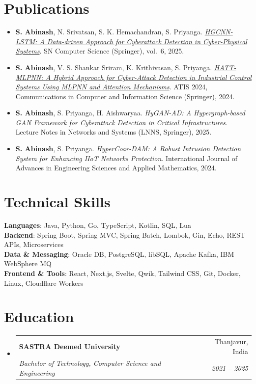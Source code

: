 \documentclass[letterpaper,11pt]{article}
\makeatletter
\newcommand{\resumeSubheading}[4]{
  \vspace{-1pt}\item
    \begin{tabular*}{\linewidth}[t]{l@{\extracolsep{\fill}}r}
      \textbf{#1} & \small #2 \\
      \small\textit{#3} & \small\textit{#4} \\
    \end{tabular*}\vspace{-6pt}
}
\newcommand{\resumeListStart}{\begin{itemize}[leftmargin=0.15in, label={}]}
\newcommand{\resumeListEnd}{\end{itemize}}
\makeatother
\begin{document}
\section{Publications}
\begin{itemize}[leftmargin=0.33in, itemsep=1pt, topsep=2pt]
  \small
  \item \textbf{S. Abinash}, N. Srivatsan, S. K. Hemachandran, S. Priyanga.
    \href{https://doi.org/10.1007/s42979-024-03613-7}{\textit{HGCNN-LSTM: A Data-driven Approach for Cyberattack
    Detection in Cyber-Physical Systems}}. SN Computer Science (Springer), vol.~6, 2025.
  \item \textbf{S. Abinash}, V. S. Shankar Sriram, K. Krithivasan, S. Priyanga.
    \href{https://doi.org/10.1007/978-981-97-9743-1_13}{\textit{HATT-MLPNN: A Hybrid Approach for Cyber-Attack
    Detection in Industrial Control Systems Using MLPNN and Attention Mechanisms}}. ATIS 2024, Communications in Computer and Information Science
    (Springer), 2024.
  \item \textbf{S. Abinash}, S. Priyanga, H. Aishwaryaa.
    \textit{HyGAN-AD: A Hypergraph-based GAN Framework for Cyberattack Detection in Critical Infrastructures}.
    Lecture Notes in Networks and Systems (LNNS, Springer), 2025.
  \item \textbf{S. Abinash}, S. Priyanga.
    \textit{HyperCoar-DAM: A Robust Intrusion Detection System for Enhancing IIoT Networks Protection}.
    International Journal of Advances in Engineering Sciences and Applied Mathematics, 2024.
\end{itemize}
\vspace{-4pt}

\section{Technical Skills}
\begin{itemize}[leftmargin=0.15in, label={}]
  \small{\item{
    \textbf{Languages}{: Java, Python, Go, TypeScript, Kotlin, SQL, Lua} \\
    \textbf{Backend}{: Spring Boot, Spring MVC, Spring Batch, Lombok, Gin, Echo, REST APIs, Microservices} \\
    \textbf{Data \& Messaging}{: Oracle DB, PostgreSQL, libSQL, Apache Kafka, IBM WebSphere MQ} \\
    \textbf{Frontend \& Tools}{: React, Next.js, Svelte, Qwik, Tailwind CSS, Git, Docker, Linux, Cloudflare Workers}
  }}
\end{itemize}
\vspace{-8pt}

\section{Education}
\resumeListStart
  \resumeSubheading
    {SASTRA Deemed University}{Thanjavur, India}
    {Bachelor of Technology, Computer Science and Engineering}{2021 -- 2025}
\resumeListEnd
\end{document}
